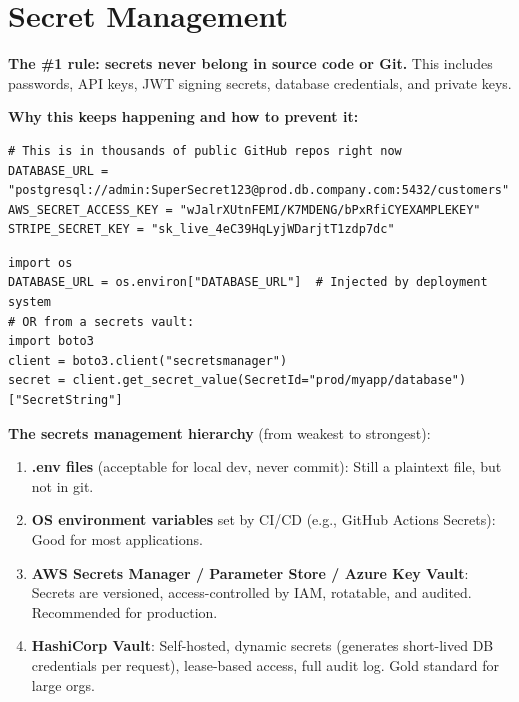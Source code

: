 \documentclass[11pt, letterpaper]{article}
\begin{document}
\vspace{8pt}

\section*{Secret Management}

\textbf{The \#1 rule: secrets never belong in source code or Git.} This includes passwords, API keys, JWT signing secrets, database credentials, and private keys.

\textbf{Why this keeps happening and how to prevent it:}

\begin{lstlisting}[style=vuln, caption={VULNERABLE: hardcoded credentials -- found via GitHub search in minutes}]
# This is in thousands of public GitHub repos right now
DATABASE_URL = "postgresql://admin:SuperSecret123@prod.db.company.com:5432/customers"
AWS_SECRET_ACCESS_KEY = "wJalrXUtnFEMI/K7MDENG/bPxRfiCYEXAMPLEKEY"
STRIPE_SECRET_KEY = "sk_live_4eC39HqLyjWDarjtT1zdp7dc"
\end{lstlisting}

\begin{lstlisting}[style=safe, caption={SECURE: secrets from environment / vault at runtime}]
import os
DATABASE_URL = os.environ["DATABASE_URL"]  # Injected by deployment system
# OR from a secrets vault:
import boto3
client = boto3.client("secretsmanager")
secret = client.get_secret_value(SecretId="prod/myapp/database")["SecretString"]
\end{lstlisting}

\textbf{The secrets management hierarchy} (from weakest to strongest):
\begin{enumerate}[noitemsep]
  \item \textbf{.env files} (acceptable for local dev, never commit): Still a plaintext file, but not in git.
  \item \textbf{OS environment variables} set by CI/CD (e.g., GitHub Actions Secrets): Good for most applications.
  \item \textbf{AWS Secrets Manager / Parameter Store / Azure Key Vault}: Secrets are versioned, access-controlled by IAM, rotatable, and audited. Recommended for production.
  \item \textbf{HashiCorp Vault}: Self-hosted, dynamic secrets (generates short-lived DB credentials per request), lease-based access, full audit log. Gold standard for large orgs.
\end{enumerate}
\end{document}
